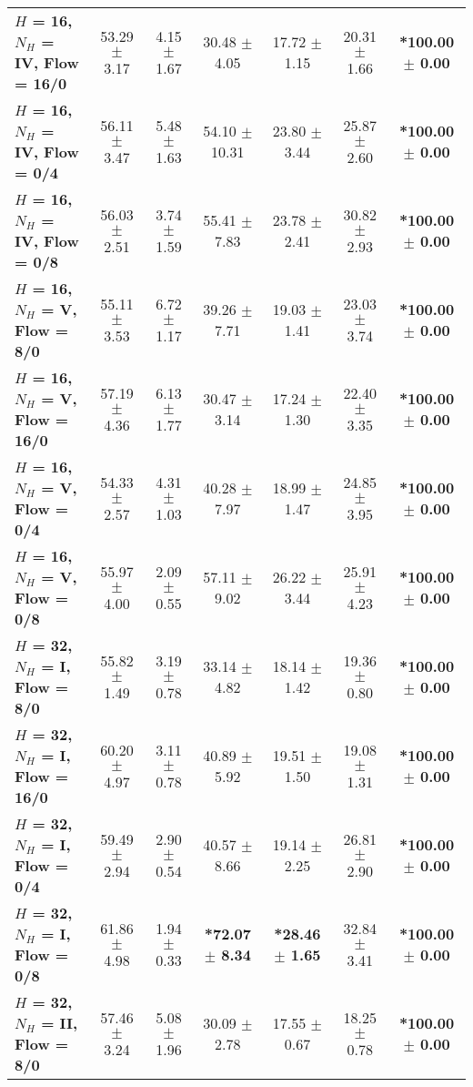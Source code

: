 \begin{table*}[ht]
{\begin{tabular}{lcccccc}
        \textbf{$H$ = 16, $N_H$ = IV, Flow = 16/0} & 53.29 $\pm$ 3.17 & 4.15 $\pm$ 1.67 & 30.48 $\pm$ 4.05 & 17.72 $\pm$ 1.15 & 20.31 $\pm$ 1.66 & \textbf{*100.00 $\pm$ 0.00} \\
        \textbf{$H$ = 16, $N_H$ = IV, Flow = 0/4} & 56.11 $\pm$ 3.47 & 5.48 $\pm$ 1.63 & 54.10 $\pm$ 10.31 & 23.80 $\pm$ 3.44 & 25.87 $\pm$ 2.60 & \textbf{*100.00 $\pm$ 0.00} \\
        \textbf{$H$ = 16, $N_H$ = IV, Flow = 0/8} & 56.03 $\pm$ 2.51 & 3.74 $\pm$ 1.59 & 55.41 $\pm$ 7.83 & 23.78 $\pm$ 2.41 & 30.82 $\pm$ 2.93 & \textbf{*100.00 $\pm$ 0.00} \\
        \midrule
        \textbf{$H$ = 16, $N_H$ = V, Flow = 8/0} & 55.11 $\pm$ 3.53 & 6.72 $\pm$ 1.17 & 39.26 $\pm$ 7.71 & 19.03 $\pm$ 1.41 & 23.03 $\pm$ 3.74 & \textbf{*100.00 $\pm$ 0.00} \\
        \textbf{$H$ = 16, $N_H$ = V, Flow = 16/0} & 57.19 $\pm$ 4.36 & 6.13 $\pm$ 1.77 & 30.47 $\pm$ 3.14 & 17.24 $\pm$ 1.30 & 22.40 $\pm$ 3.35 & \textbf{*100.00 $\pm$ 0.00} \\
        \textbf{$H$ = 16, $N_H$ = V, Flow = 0/4} & 54.33 $\pm$ 2.57 & 4.31 $\pm$ 1.03 & 40.28 $\pm$ 7.97 & 18.99 $\pm$ 1.47 & 24.85 $\pm$ 3.95 & \textbf{*100.00 $\pm$ 0.00} \\
        \textbf{$H$ = 16, $N_H$ = V, Flow = 0/8} & 55.97 $\pm$ 4.00 & 2.09 $\pm$ 0.55 & 57.11 $\pm$ 9.02 & 26.22 $\pm$ 3.44 & 25.91 $\pm$ 4.23 & \textbf{*100.00 $\pm$ 0.00} \\
        \midrule
        \midrule
        \textbf{$H$ = 32, $N_H$ = I, Flow = 8/0} & 55.82 $\pm$ 1.49 & 3.19 $\pm$ 0.78 & 33.14 $\pm$ 4.82 & 18.14 $\pm$ 1.42 & 19.36 $\pm$ 0.80 & \textbf{*100.00 $\pm$ 0.00} \\
        \textbf{$H$ = 32, $N_H$ = I, Flow = 16/0} & 60.20 $\pm$ 4.97 & 3.11 $\pm$ 0.78 & 40.89 $\pm$ 5.92 & 19.51 $\pm$ 1.50 & 19.08 $\pm$ 1.31 & \textbf{*100.00 $\pm$ 0.00} \\
        \textbf{$H$ = 32, $N_H$ = I, Flow = 0/4} & 59.49 $\pm$ 2.94 & 2.90 $\pm$ 0.54 & 40.57 $\pm$ 8.66 & 19.14 $\pm$ 2.25 & 26.81 $\pm$ 2.90 & \textbf{*100.00 $\pm$ 0.00} \\
        \textbf{$H$ = 32, $N_H$ = I, Flow = 0/8} & 61.86 $\pm$ 4.98 & 1.94 $\pm$ 0.33 & \textbf{*72.07 $\pm$ 8.34} & \textbf{*28.46 $\pm$ 1.65} & 32.84 $\pm$ 3.41 & \textbf{*100.00 $\pm$ 0.00} \\
        \midrule
        \textbf{$H$ = 32, $N_H$ = II, Flow = 8/0} & 57.46 $\pm$ 3.24 & 5.08 $\pm$ 1.96 & 30.09 $\pm$ 2.78 & 17.55 $\pm$ 0.67 & 18.25 $\pm$ 0.78 & \textbf{*100.00 $\pm$ 0.00} \\

\end{tabular}}
\end{table*}
